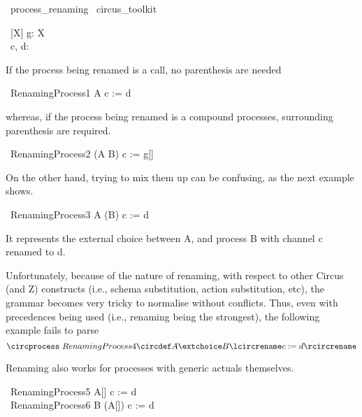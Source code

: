 \begin{zsection}
  \SECTION\ process\_renaming \parents\ circus\_toolkit
\end{zsection}

\begin{circus}
   \circchannel\ [X] g: X \cross \nat \\
   \circchannel\ c, d: \nat \cross \nat
\end{circus}

If the process being renamed is a call, no parenthesis are needed
%
\begin{circus}
   \circprocess\ RenamingProcess1 \circdef A \lcircrename c := d \rcircrename
\end{circus}
%
whereas, if the process being renamed is a compound processes,
surrounding parenthesis are required.
%
\begin{circus}
   \circprocess\ RenamingProcess2 \circdef (A \extchoice B) \lcircrename c := g[\nat] \rcircrename
\end{circus}
%
On the other hand, trying to mix them up can be confusing, as the next example shows.
%
\begin{circus}
     \circprocess\ RenamingProcess3 \circdef A \extchoice (B) \lcircrename c := d \rcircrename
\end{circus}
%
It represents the external choice between A, and process B with channel c renamed to d.

Unfortunately, because of the nature of renaming, with respect to other Circus (and Z)
constructs (i.e., schema substitution, action substitution, etc), the grammar becomes
very tricky to normalise without conflicts. Thus, even with precedences being used
(i.e., renaming being the strongest), the following example fails to parse
%
\[
     \circprocess\ RenamingProcess4 \circdef A \extchoice B \lcircrename c := d \rcircrename
\]

Renaming also works for processes with generic actuals themselves.
%
\begin{circus}
     \circprocess\ RenamingProcess5 \circdef A[\nat] \lcircrename c := d \rcircrename \\
     \circprocess\ RenamingProcess6 \circdef B \extchoice (A[\nat]) \lcircrename c := d \rcircrename
\end{circus}
